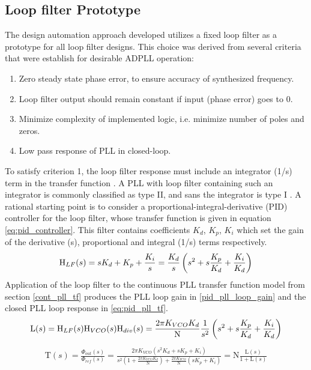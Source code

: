 \subsection{Loop filter Prototype}
	The design automation approach developed utilizes a fixed loop filter as a prototype for all loop filter designs. This choice was derived from several criteria that were establish for desirable ADPLL operation:
	\begin{enumerate}[itemsep=0pt,label=\protect\mycirc{\arabic*}]
		\setlength\itemsep{-0.8em}
		\item Zero steady state phase error, to ensure accuracy of synthesized frequency.
		\item Loop filter output should remain constant if input (phase error) goes to 0.
		\item Minimize complexity of implemented logic, i.e. minimize number of poles and zeros.
		\item Low pass response of PLL in closed-loop.
	\end{enumerate}
	To satisfy criterion 1, the loop filter response must include an integrator (1/s) term in the transfer function \cite{ogata_2010}. A PLL with loop filter containing such an integrator is commonly classified as type II, and sans the integrator is type I \cite{gardner_2005}. A rational starting point is to consider a proportional-integral-derivative (PID) controller \cite{ogata_2010_pid} for the loop filter, whose transfer function is given in equation \ref{eq:pid_controller}. This filter contains coefficients $K_d$, $K_p$, $K_i$ which set the gain of the derivative (s), proportional and integral (1/s) terms respectively. 
	\begin{equation}\label{eq:pid_controller}
		\textnormal{H}_{LF}(s) = sK_d + K_p + \frac{K_i}{s} = \frac{K_d}{s}\left(s^2 + s\frac{K_p}{K_d} + \frac{K_i}{K_d}\right)
	\end{equation}
	Application of the loop filter to the continuous PLL transfer function model from section \ref{cont_pll_tf} produces the PLL loop gain in \ref{pid_pll_loop_gain} and the closed PLL loop response in \ref{eq:pid_pll_tf}.
	\begin{equation} \label{pid_pll_loop_gain}
		\mathrm{L}(s) = \textnormal{H}_{LF}(s)\textnormal{H}_{VCO}(s)\textnormal{H}_{div}(s) = \frac{2\pi K_{VCO}K_d}{\mathrm{N}}\frac{1}{s^2}\left(s^2 + s\frac{K_p}{K_d} + \frac{K_i}{K_d}\right)
	\end{equation}
	\begin{align} \label{eq:pid_pll_tf}
		\mathrm{T}(s) = \frac{\Phi_{out}(s)}{\Phi_{ref}(s)} = \frac{2\pi K_{VCO}\left(s^2K_d + sK_p + K_i\right)}{s^2\left(1 + \frac{2\pi K_{VCO}K_d}{\mathrm{N}}\right) + \frac{2\pi K_{VCO}}{\mathrm{N}}\left(sK_p + K_i\right)} = \mathrm{N}\frac{\mathrm{L}(s)}{1 + \mathrm{L}(s)}
	\end{align}
